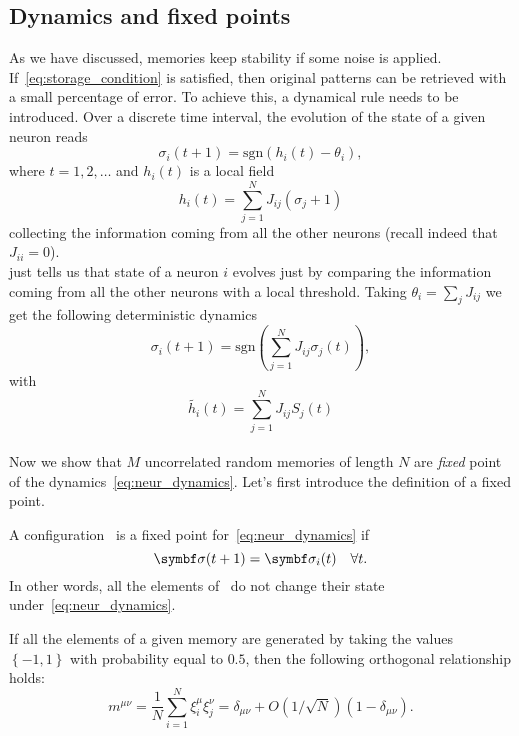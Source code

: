 \documentclass[\rootdir/main.tex]{subfiles}
\begin{document}
\subsection{Dynamics and fixed points}
As we have discussed, memories keep stability if some noise is applied. If~\cref{eq:storage_condition} is satisfied, then original patterns can be retrieved with a small percentage of error. To achieve this, a dynamical rule needs to be introduced. Over a discrete time interval, the evolution of the state of a given neuron reads
\begin{equation}
    \sigma_i(t+1) = \text{sgn}\left(h_i(t) - \theta_i \right),
\end{equation}
where $t = 1, 2, \dots$ and $h_i(t)$ is a local field
\begin{equation}
    h_i(t) = \sum_{j = 1}^{N} J_{ij}(\sigma_j + 1)
\end{equation}
collecting the information coming from all the other neurons (recall indeed that $J_{ii} = 0$).\\
 just tells us that state of a neuron $i$ evolves just by comparing the information coming from all the other neurons with a local threshold.
Taking $\theta_i = \sum_j J_{ij}$ we get the following deterministic dynamics
\begin{equation}\label{eq:neur_dynamics}
    \sigma_i(t+1) = \text{sgn}\left(\sum_{j = 1}^N J_{ij}\sigma_j(t) \right),
\end{equation}
with
\begin{equation}
    \tilde{h_i}(t) = \sum_{j = 1}^N J_{ij}S_j(t)
\end{equation}\\
Now we show that $M$ uncorrelated random memories of length $N$ are \emph{fixed} point of the dynamics~\cref{eq:neur_dynamics}. Let's first introduce the definition of a fixed point.\\
\begin{definition}
A configuration \bsigma\ is a fixed point for~\cref{eq:neur_dynamics} if
\begin{equation}
    \bsigma(t+1) = \bsigma_i(t) \quad \forall t.
\end{equation}
In other words, all the elements of \bsigma\ do not change their state under~\cref{eq:neur_dynamics}.
\end{definition}
If all the elements of a given memory are generated by taking the values $\left\{-1, 1\right\}$ with probability equal to $0.5$, then the following orthogonal relationship holds:
\begin{equation}\label{eq:orthogonality}
    m^{\mu \nu} = \frac{1}{N} \sum_{i = 1}^{N} \xi_i^\mu \xi_j^\nu = \delta_{\mu \nu} +  O\left(1/\sqrt{N} \right) \left(1 - \delta_{\mu \nu} \right).
\end{equation}
\end{document}
